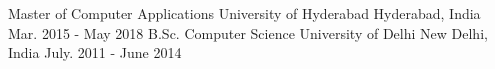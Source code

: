 \begin{cventries}
  \cventry
    {Master of Computer Applications}
    {University of Hyderabad}
    {Hyderabad, India}
    {Mar. 2015 - May 2018}
    {}
  \cventry
  {B.Sc. Computer Science}
  {University of Delhi}
  {New Delhi, India}
  {July. 2011 - June 2014}
  {}
\end{cventries}
